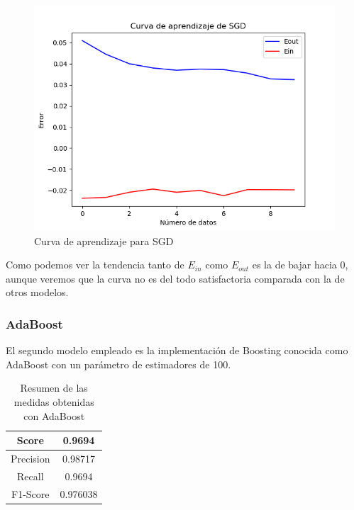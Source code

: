 \begin{figure}[H] %
	\centering
	\includegraphics[scale=0.6]{aprendizaje-SGD.png}  %
	\caption{Curva de aprendizaje para SGD} 
	\label{fig:aprendizaje-sgd}
\end{figure}

Como podemos ver la tendencia tanto de $E_{in}$ como $E_{out}$ es la de bajar hacia 0, aunque veremos que la curva no es del todo satisfactoria comparada con la de otros modelos.

\subsubsection{AdaBoost}

El segundo modelo empleado es la implementación de Boosting conocida como AdaBoost con un parámetro de estimadores de 100. 

\begin{table}[H]
	\centering
	\begin{tabular}{|c|c|}
		\hline
		Score     & 0.9694   \\ \hline
		Precision & 0.98717  \\ \hline
		Recall    & 0.9694   \\ \hline
		F1-Score  & 0.976038 \\ \hline
	\end{tabular}
	\caption{Resumen de las medidas obtenidas con AdaBoost}
\end{table}

